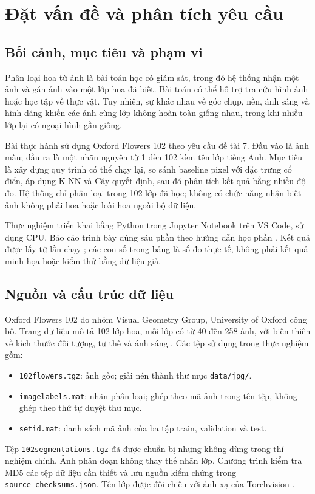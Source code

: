 \section{Đặt vấn đề và phân tích yêu cầu}
\subsection{Bối cảnh, mục tiêu và phạm vi}
Phân loại hoa từ ảnh là bài toán học có giám sát, trong đó hệ thống nhận một ảnh và gán ảnh vào một lớp hoa đã biết. Bài toán có thể hỗ trợ tra cứu hình ảnh hoặc học tập về thực vật. Tuy nhiên, sự khác nhau về góc chụp, nền, ánh sáng và hình dáng khiến các ảnh cùng lớp không hoàn toàn giống nhau, trong khi nhiều lớp lại có ngoại hình gần giống.

Bài thực hành sử dụng Oxford Flowers 102 theo yêu cầu đề tài 7. Đầu vào là ảnh màu; đầu ra là một nhãn nguyên từ 1 đến 102 kèm tên lớp tiếng Anh. Mục tiêu là xây dựng quy trình có thể chạy lại, so sánh baseline pixel với đặc trưng cổ điển, áp dụng K-NN và Cây quyết định, sau đó phân tích kết quả bằng nhiều độ đo. Hệ thống chỉ phân loại trong 102 lớp đã học; không có chức năng nhận biết ảnh không phải hoa hoặc loài hoa ngoài bộ dữ liệu.

Thực nghiệm triển khai bằng Python trong Jupyter Notebook trên VS Code, sử dụng CPU. Báo cáo trình bày đúng sáu phần theo hướng dẫn học phần \cite{fit4013}. Kết quả được lấy từ lần chạy \texttt{\RunID}; các con số trong bảng là số đo thực tế, không phải kết quả minh họa hoặc kiểm thử bằng dữ liệu giả.

\subsection{Nguồn và cấu trúc dữ liệu}
Oxford Flowers 102 do nhóm Visual Geometry Group, University of Oxford công bố. Trang dữ liệu mô tả 102 lớp hoa, mỗi lớp có từ 40 đến 258 ảnh, với biến thiên về kích thước đối tượng, tư thế và ánh sáng \cite{oxford}. Các tệp sử dụng trong thực nghiệm gồm:
\begin{itemize}
\item \texttt{102flowers.tgz}: ảnh gốc; giải nén thành thư mục \texttt{data/jpg/}.
\item \texttt{imagelabels.mat}: nhãn phân loại; ghép theo mã ảnh trong tên tệp, không ghép theo thứ tự duyệt thư mục.
\item \texttt{setid.mat}: danh sách mã ảnh của ba tập train, validation và test.
\end{itemize}
Tệp \texttt{102segmentations.tgz} đã được chuẩn bị nhưng không dùng trong thí nghiệm chính. Ảnh phân đoạn không thay thế nhãn lớp. Chương trình kiểm tra MD5 các tệp dữ liệu cần thiết và lưu nguồn kiểm chứng trong \texttt{source\_checksums.json}. Tên lớp được đối chiếu với ánh xạ của Torchvision \cite{torchvision}.

